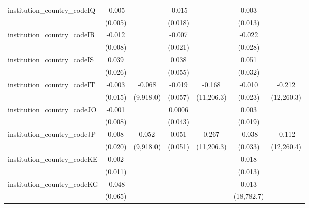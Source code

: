 \begin{tabular}{lcccccc}
   institution\_country\_codeIQ          & -0.005         &               & -0.015        &              & 0.003        &   \\   
                                         & (0.005)        &               & (0.018)       &              & (0.013)      &   \\   
   institution\_country\_codeIR          & -0.012         &               & -0.007        &              & -0.022       &   \\   
                                         & (0.008)        &               & (0.021)       &              & (0.028)      &   \\   
   institution\_country\_codeIS          & 0.039          &               & 0.038         &              & 0.051        &   \\   
                                         & (0.026)        &               & (0.055)       &              & (0.032)      &   \\   
   institution\_country\_codeIT          & -0.003         & -0.068        & -0.019        & -0.168       & -0.010       & -0.212\\   
                                         & (0.015)        & (9,918.0)     & (0.057)       & (11,206.3)   & (0.023)      & (12,260.3)\\   
   institution\_country\_codeJO          & -0.001         &               & 0.0006        &              & 0.003        &   \\   
                                         & (0.008)        &               & (0.043)       &              & (0.019)      &   \\   
   institution\_country\_codeJP          & 0.008          & 0.052         & 0.051         & 0.267        & -0.038       & -0.112\\   
                                         & (0.020)        & (9,918.0)     & (0.051)       & (11,206.3)   & (0.033)      & (12,260.4)\\   
   institution\_country\_codeKE          & 0.002          &               &               &              & 0.018        &   \\   
                                         & (0.011)        &               &               &              & (0.013)      &   \\   
   institution\_country\_codeKG          & -0.048         &               &               &              & 0.013        &   \\   
                                         & (0.065)        &               &               &              & (18,782.7)   &   \\   

\end{tabular}
